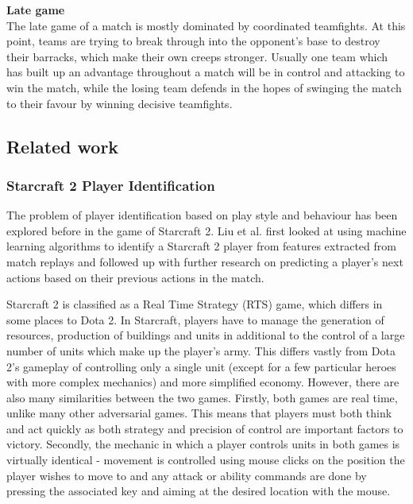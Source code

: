 \documentclass[Report.tex]{subfiles}
\begin{document}
\textbf{Late game} \\
The late game of a match is mostly dominated by coordinated teamfights. At this point, teams are trying to break through into the opponent's base to destroy their barracks, which make their own creeps stronger. Usually one team which has built up an advantage throughout a match will be in control and attacking to win the match, while the losing team defends in the hopes of swinging the match to their favour by winning decisive teamfights. 

\subsection{Related work}

\subsubsection{Starcraft 2 Player Identification}
The problem of player identification based on play style and behaviour has been explored before in the game of Starcraft 2. Liu et al. \cite{starcraft-identification} first looked at using machine learning algorithms to identify a Starcraft 2 player from features extracted from match replays and followed up with further research \cite{starcraft-actions} on predicting a player's next actions based on their previous actions in the match. 

Starcraft 2 is classified as a Real Time Strategy (RTS) game, which differs in some places to Dota 2. In Starcraft, players have to manage the generation of resources, production of buildings and units in additional to the control of a large number of units which make up the player's army. This differs vastly from Dota 2's gameplay of controlling only a single unit (except for a few particular heroes with more complex mechanics) and more simplified economy. However, there are also many similarities between the two games. Firstly, both games are real time, unlike many other adversarial games. This means that players must both think and act quickly as both strategy and precision of control are important factors to victory. Secondly, the mechanic in which a player controls units in both games is virtually identical - movement is controlled using mouse clicks on the position the player wishes to move to and any attack or ability commands are done by pressing the associated key and aiming at the desired location with the mouse.
\end{document}
